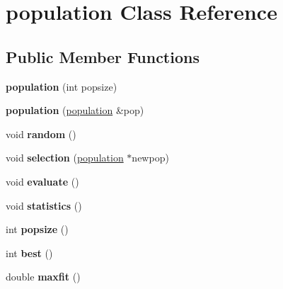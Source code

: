 \hypertarget{classpopulation}{\section{population \-Class \-Reference}
\label{classpopulation}
}
\subsection*{\-Public \-Member \-Functions}
\begin{DoxyCompactItemize}
\item 
\hypertarget{classpopulation_a2432a12b0fb5ec200e4d270049e8d11b}{{\bfseries population} (int popsize)}\label{classpopulation_a2432a12b0fb5ec200e4d270049e8d11b}

\item 
\hypertarget{classpopulation_a5a690415b3dfb17de0dcbfa9ed7cba62}{{\bfseries population} (\hyperlink{classpopulation}{population} \&pop)}\label{classpopulation_a5a690415b3dfb17de0dcbfa9ed7cba62}

\item 
\hypertarget{classpopulation_a8d4345e20e8af206e1cac16766e058f6}{void {\bfseries random} ()}\label{classpopulation_a8d4345e20e8af206e1cac16766e058f6}

\item 
\hypertarget{classpopulation_a071b7f4da9bb94f7fa3497f38f9e993f}{void {\bfseries selection} (\hyperlink{classpopulation}{population} $\ast$newpop)}\label{classpopulation_a071b7f4da9bb94f7fa3497f38f9e993f}

\item 
\hypertarget{classpopulation_a1a5837ba611e81f62a9639601598f463}{void {\bfseries evaluate} ()}\label{classpopulation_a1a5837ba611e81f62a9639601598f463}

\item 
\hypertarget{classpopulation_a6aaaef482b99ab53dc9f2f51c41c4a1b}{void {\bfseries statistics} ()}\label{classpopulation_a6aaaef482b99ab53dc9f2f51c41c4a1b}

\item 
\hypertarget{classpopulation_a14408db3ab5dea85140a2b82c7cf5b0f}{int {\bfseries popsize} ()}\label{classpopulation_a14408db3ab5dea85140a2b82c7cf5b0f}

\item 
\hypertarget{classpopulation_acca98c9cf28b1406354398fe87f3037e}{int {\bfseries best} ()}\label{classpopulation_acca98c9cf28b1406354398fe87f3037e}

\item 
\hypertarget{classpopulation_a9fe018ae4be1bd407ba155db225c289e}{double {\bfseries maxfit} ()}\label{classpopulation_a9fe018ae4be1bd407ba155db225c289e}


\end{DoxyCompactItemize}
